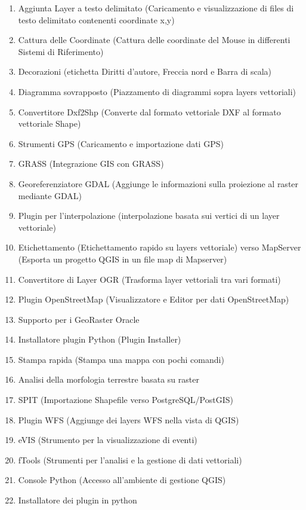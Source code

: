 \begin{enumerate}
\item Aggiunta Layer a testo delimitato (Caricamento e visualizzazione di files di testo delimitato contenenti coordinate x,y)
\item Cattura delle Coordinate (Cattura delle coordinate del Mouse in differenti Sistemi di Riferimento)
\item Decorazioni (etichetta Diritti d’autore, Freccia nord e Barra di scala)
\item Diagramma sovrapposto (Piazzamento di diagrammi sopra layers vettoriali)
\item Convertitore Dxf2Shp (Converte dal formato vettoriale DXF al formato vettoriale Shape)
\item Strumenti GPS (Caricamento e importazione dati GPS)
\item GRASS (Integrazione GIS con GRASS)
\item Georeferenziatore GDAL (Aggiunge le informazioni sulla proiezione al raster mediante GDAL)
\item Plugin per l'interpolazione (interpolazione basata sui vertici di un layer vettoriale)
\item Etichettamento (Etichettamento rapido su layers vettoriale)
\itemEsportazione verso MapServer (Esporta un progetto QGIS in un file map di Mapserver)
\item Convertitore di Layer OGR (Trasforma layer vettoriali tra vari formati)
\item Plugin OpenStreetMap (Visualizzatore e Editor per dati OpenStreetMap)
\item Supporto per i GeoRaster Oracle
\item Installatore plugin Python (Plugin Installer)
\item Stampa rapida (Stampa una mappa con pochi comandi)
\item Analisi della morfologia terrestre basata su raster
\item SPIT (Importazione Shapefile verso PostgreSQL/PostGIS)
\item Plugin WFS (Aggiunge dei layers WFS nella vista di QGIS)
\item eVIS (Strumento per la visualizzazione di eventi)
\item fTools (Strumenti per l'analisi e la gestione di dati vettoriali)
\item Console Python (Accesso all'ambiente di gestione QGIS)
\item Installatore dei plugin in python
\end{enumerate}

